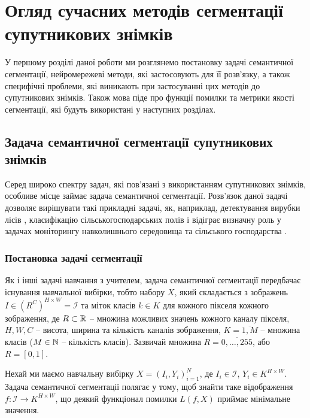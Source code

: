 
\chapter{Огляд сучасних методів сегментації супутникових знімків}
\label{chap:review}

У першому розділі даної роботи ми розглянемо постановку
задачі семантичної сегментації, нейромережеві методи, які
застосовують для її розв'язку, а також специфічні проблеми,
які виникають при застосуванні цих методів до супутникових
знімків. Також мова піде про функції помилки та метрики якості
сегментації, які будуть використані у наступних розділах.

\section{Задача семантичної сегментації супутникових знімків}

Серед широко спектру задач, які пов'язані з використанням
супутникових знімків, особливе місце займає задача семантичної
сегментації. Розв'язок даної задачі дозволяє вирішувати такі прикладні задачі,
як, наприклад, детектування вирубки лісів \cite{sat_logging}, класифікацію
сільськогосподарських полів \cite{kussul2017deep}
і відіграє визначну роль у задачах моніторингу навколишнього
середовища та сільського господарства \cite{kolotii2015comparison}.

\subsection{Постановка задачі сегментації}

Як і інші задачі навчання з учителем, задача семантичної сегментації
передбачає існування навчальної вибірки, тобто набору $X$,
який складається з зображень
$I \in \left( R^C \right)^{H \times W} = \mathcal{I}$ та міток класів
$k \in K$ для кожного пікселя кожного зображення, де $R \subset \operatorname{\mathbb{R}}$ --
множина можливих значень кожного каналу пікселя,
$H, W, C$ -- висота, ширина та кількість каналів зображення,
$K = \overline{1, M}$ -- множина класів ($M \in \operatorname{\mathbb{N}}$ -- кількість класів).
Зазвичай множина $R = \overline{0, \dots, 255}$, або $R = [0, 1]$.

\begin{definition}\label{def:sem_segm_task}
    Нехай ми маємо навчальну вибірку $X=(I_i, Y_i)_{i=1}^{N}$,
    де $I_i \in \mathcal{I}$, $Y_i \in K^{H \times W}$.
    Задача семантичної сегментації полягає у тому, щоб
    знайти таке відображення
    $f: \mathcal{I} \rightarrow K^{H \times W}$, що деякий функціонал помилки
    $L(f, X)$ приймає мінімальне значення.
\end{definition}

